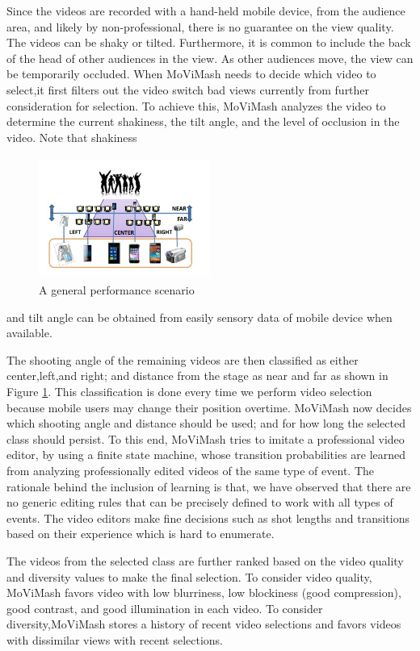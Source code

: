 \documentclass{sig-alternate}
\begin{document}
 Since the videos are recorded with a hand-held mobile device, from the audience area, and likely by non-professional, there is no guarantee on the view quality. The videos can be shaky or tilted. Furthermore, it is common to include the back of the head of other audiences in the view. As other audiences move, the view can be temporarily occluded. When MoViMash needs to decide which video to select,it first filters out the video switch bad views currently from further consideration for selection. To achieve this, MoViMash analyzes the video to determine the current shakiness, the tilt angle, and the level of occlusion in the video. Note that shakiness
 \begin{figure}[h]
\includegraphics[width=0.5\textwidth ,height = 4cm]{image1}
\caption{A general performance scenario}
\label{fig:figure1}
\end{figure}
and tilt angle can be obtained from easily sensory data of mobile device when available. 

The shooting angle of the remaining videos are then classiﬁed as either center,left,and right; and distance from the stage as near and far as shown in Figure \ref{fig:figure1}. This classiﬁcation is done every time we perform video selection because mobile users may change their position overtime. MoViMash now decides which shooting angle and distance should be used; and for how long the selected class should persist. To this end, MoViMash tries to imitate a professional video editor, by using a ﬁnite state machine, whose transition probabilities are learned from analyzing professionally edited videos of the same type of event. The rationale behind the inclusion of learning is that, we have observed that there are no generic editing rules that can be precisely deﬁned to work with all types of events. The video editors make ﬁne decisions such as shot lengths and transitions based on their experience which is hard to enumerate. 

The videos from the selected class are further ranked based on the video quality and diversity values to make the ﬁnal selection. To consider video quality, MoViMash favors video with low blurriness, low blockiness (good compression), good contrast, and good illumination in each video. To consider diversity,MoViMash stores a history of recent video selections and favors videos with dissimilar views with recent selections. 
\end{document}
